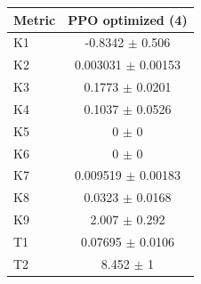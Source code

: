 \begin{tabular}{lc}
\toprule
Metric & PPO optimized (4) \\
\midrule
K1 & -0.8342 $\pm$ 0.506 \\
K2 & 0.003031 $\pm$ 0.00153 \\
K3 & 0.1773 $\pm$ 0.0201 \\
K4 & 0.1037 $\pm$ 0.0526 \\
K5 & 0 $\pm$ 0 \\
K6 & 0 $\pm$ 0 \\
K7 & 0.009519 $\pm$ 0.00183 \\
K8 & 0.0323 $\pm$ 0.0168 \\
K9 & 2.007 $\pm$ 0.292 \\
T1 & 0.07695 $\pm$ 0.0106 \\
T2 & 8.452 $\pm$ 1 \\
\bottomrule
\end{tabular}
